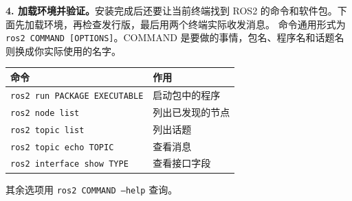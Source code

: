 \textbf{4. 加载环境并验证。}安装完成后还要让当前终端找到 ROS2 的命令和软件包。下面先加载环境，再检查发行版，最后用两个终端实际收发消息。
命令通用形式为 \texttt{ros2 COMMAND [OPTIONS]}。COMMAND 是要做的事情，包名、程序名和话题名则换成你实际使用的名字。
\begin{center}
\begin{tabular}{ll}
\toprule[1.5pt]
命令 & 作用 \\
\midrule[1pt]
\texttt{ros2 run PACKAGE EXECUTABLE} & 启动包中的程序 \\
\texttt{ros2 node list} & 列出已发现的节点 \\
\texttt{ros2 topic list} & 列出话题 \\
\texttt{ros2 topic echo TOPIC} & 查看消息 \\
\texttt{ros2 interface show TYPE} & 查看接口字段 \\
\bottomrule[1.5pt]
\end{tabular}
\end{center}
其余选项用 \texttt{ros2 COMMAND --help} 查询。
